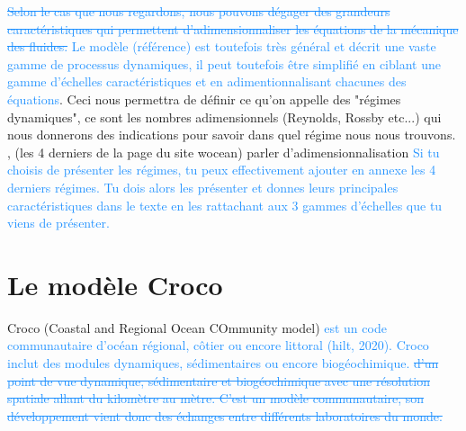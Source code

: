 \documentclass{rapportECC}
\newcommand{\FAadd}[1]{\textcolor{DodgerBlue}{{#1}}}                     %
\newcommand{\FAdel}[1]{\textcolor{DodgerBlue}{\sout{#1}}}                %
\begin{document}
\FAdel{Selon le cas que nous regardons, nous pouvons dégager des grandeurs caractéristiques qui permettent d'adimensionnaliser les équations de la mécanique des fluides.} \FAadd{Le modèle (référence) est toutefois très général et décrit une vaste gamme de processus dynamiques, il peut toutefois être simplifié en ciblant une gamme d'échelles caractéristiques et en adimentionnalisant chacunes des équations}. Ceci nous permettra de définir ce qu'on appelle des "régimes dynamiques", ce sont les nombres adimensionnels (Reynolds, Rossby etc...) qui nous donnerons des indications pour savoir dans quel régime nous nous trouvons.
, (les 4 derniers de la page du site wocean)
parler d'adimensionnalisation
\FAadd{Si tu choisis de présenter les régimes, tu peux effectivement ajouter en annexe les 4 derniers régimes. Tu dois alors les présenter et donnes leurs principales caractéristiques dans le texte en les rattachant aux 3 gammes d'échelles que tu viens de présenter.}

\section{Le modèle Croco}
Croco (Coastal and Regional Ocean COmmunity model) \FAadd{est un code communautaire d'océan régional, côtier ou encore littoral (hilt, 2020). Croco inclut des modules dynamiques, sédimentaires ou encore biogéochimique.} \FAdel{d'un point de vue dynamique, sédimentaire et biogéochimique avec une résolution spatiale allant du kilomètre au mètre. C'est un modèle communautaire, son développement vient donc des échanges entre différents laboratoires du monde.} \\
\end{document}
